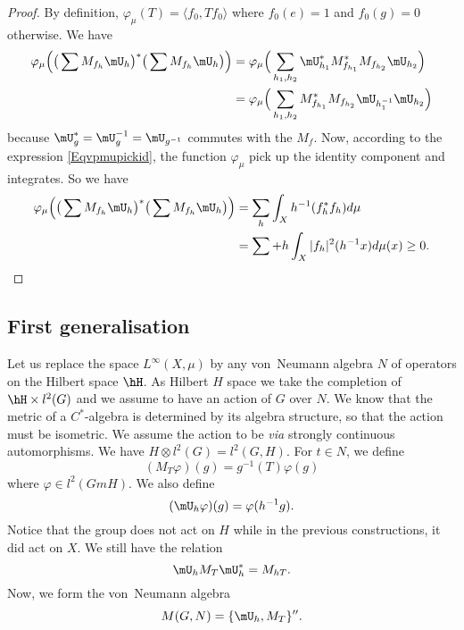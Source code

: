 \begin{proof}
By definition, $\varphi_{\mu}(T)=\langle f_0, Tf_0\rangle $ where $f_0(e)=1$ and $f_0(g)=0$ otherwise. We have
\begin{align*}
\varphi_{\mu}\Big( \big( \sum M_{f_h}\mU_h \big)^*\big( \sum M_{f_h}\mU_h \big) \Big)&=\varphi_{\mu}\Big( \sum_{h_1,h_2}\mU_{h_1}^*M_{f_{h_1}}^*M_{f_{h_2}} \mU_{h_2} \Big)\\
		&=\varphi_{\mu}\Big( \sum_{h_1,h_2}  M_{f_{h_1}}^*M_{f_{h_2}}\mU_{h_1^{-1}}\mU_{h_2} \Big)
\end{align*}
because $\mU_g^*=\mU_g^{-1}=\mU_{g^{-1}}$ commutes with the $M_f$. Now, according to the expression \eqref{Eqvpmupickid}, the function $\varphi_{\mu}$ pick up the identity component and integrates. So we have
\begin{align*}
\varphi_{\mu}\Big( \big( \sum M_{f_h}\mU_h \big)^*\big( \sum M_{f_h}\mU_h \big) \Big)&=\sum_{h}\int_X h^{-1}(f^*_hf_h)d\mu\\
							&=\sum+h\int_X| f_h |^2(h^{-1}x)d\mu(x)\geq0.
\end{align*}

\end{proof}

					\subsection{First generalisation}

Let us replace the space $ L^{\infty}(X,\mu)$ by any von~Neumann algebra $N$ of operators on the Hilbert space $\hH$. As Hilbert $H$ space we take the completion of $\hH\times l^2(G)$ and we assume to have an action of $G$ over $N$. We know that the metric of a $C^*$-algebra is determined by its algebra structure, so that the action must be isometric. We assume the action to be \emph{via} strongly continuous automorphisms. We have $H\otimes l^2(G)=l^2(G,H)$. For $t\in N$, we define 
\[ 
  (M_T\varphi)(g)=g^{-1}(T)\varphi(g)
\]
where $\varphi\in l^2(GmH)$. We also define
\[ 
  (\mU_h\varphi)(g)=\varphi(h^{-1}g).
\]
Notice that the group does not act on $H$ while in the previous constructions, it did act on $X$. We still have the relation
\begin{equation}
\mU_hM_T\mU_h^*=M_{hT}.
\end{equation}
Now, we form the von~Neumann algebra
\begin{equation}
M(G,N)=\{ \mU_h,M_T \}''.
\end{equation}

